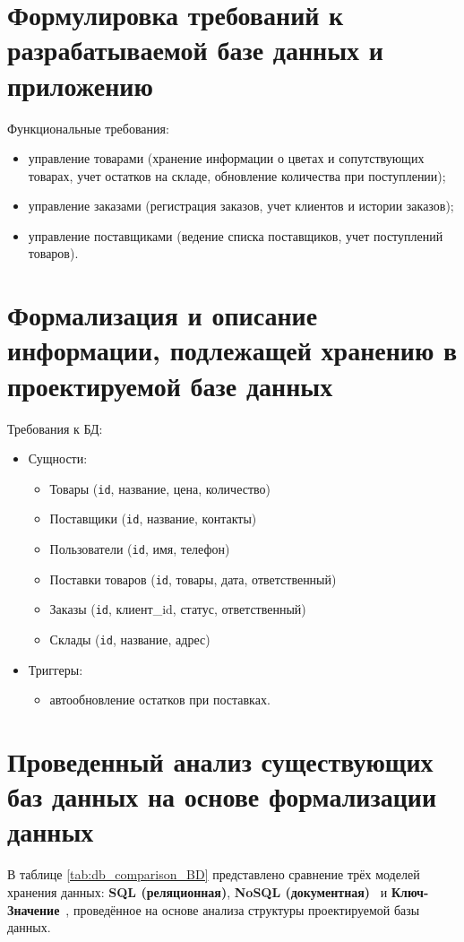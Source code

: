 \section{Формулировка требований к разрабатываемой базе данных и приложению}
Функциональные требования:
\begin{itemize}
	\item управление товарами (хранение информации о цветах и сопутствующих товарах, учет остатков на складе, обновление количества при поступлении);
	\item управление заказами (регистрация заказов, учет клиентов и истории заказов);
	\item управление поставщиками (ведение списка поставщиков, учет поступлений товаров).
\end{itemize}

\section{Формализация и описание информации, подлежащей хранению в проектируемой базе данных}
Требования к БД:
\begin{itemize}
	\item Сущности:
	\begin{itemize}
		\item Товары (\texttt{id}, название, цена, количество)
		\item Поставщики (\texttt{id}, название, контакты)
		\item Пользователи (\texttt{id}, имя, телефон)
		\item Поставки товаров (\texttt{id}, товары, дата, ответственный)
		\item Заказы (\texttt{id}, клиент\_id, статус, ответственный)
		\item Склады (\texttt{id}, название, адрес)
	\end{itemize}
	
	\item Триггеры:
	\begin{itemize}
		\item автообновление остатков при поставках.
	\end{itemize}
\end{itemize}

\section{Проведенный анализ существующих баз данных на основе формализации данных}
В таблице \ref{tab:db_comparison_BD} представлено сравнение трёх моделей хранения данных: \textbf{SQL (реляционная)}, \textbf{NoSQL (документная)}~\cite{nosql} и \textbf{Ключ-Значение}~\cite{key_value}, проведённое на основе анализа структуры проектируемой базы данных.
\clearpage

